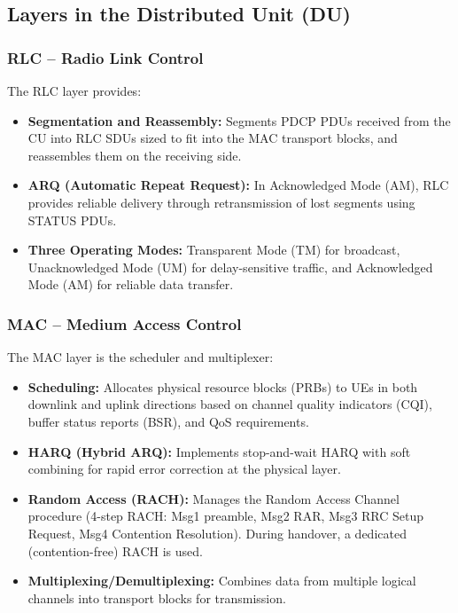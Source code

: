 \subsection{Layers in the Distributed Unit (DU)}

\subsubsection{RLC -- Radio Link Control}
The RLC layer provides:
\begin{itemize}
    \item \textbf{Segmentation and Reassembly:} Segments PDCP PDUs received from the CU into RLC SDUs sized to fit into the MAC transport blocks, and reassembles them on the receiving side.
    \item \textbf{ARQ (Automatic Repeat Request):} In Acknowledged Mode (AM), RLC provides reliable delivery through retransmission of lost segments using STATUS PDUs.
    \item \textbf{Three Operating Modes:} Transparent Mode (TM) for broadcast, Unacknowledged Mode (UM) for delay-sensitive traffic, and Acknowledged Mode (AM) for reliable data transfer.
\end{itemize}

\subsubsection{MAC -- Medium Access Control}
The MAC layer is the scheduler and multiplexer:
\begin{itemize}
    \item \textbf{Scheduling:} Allocates physical resource blocks (PRBs) to UEs in both downlink and uplink directions based on channel quality indicators (CQI), buffer status reports (BSR), and QoS requirements.
    \item \textbf{HARQ (Hybrid ARQ):} Implements stop-and-wait HARQ with soft combining for rapid error correction at the physical layer.
    \item \textbf{Random Access (RACH):} Manages the Random Access Channel procedure (4-step RACH: Msg1 preamble, Msg2 RAR, Msg3 RRC Setup Request, Msg4 Contention Resolution). During handover, a dedicated (contention-free) RACH is used.
    \item \textbf{Multiplexing/Demultiplexing:} Combines data from multiple logical channels into transport blocks for transmission.
\end{itemize}

